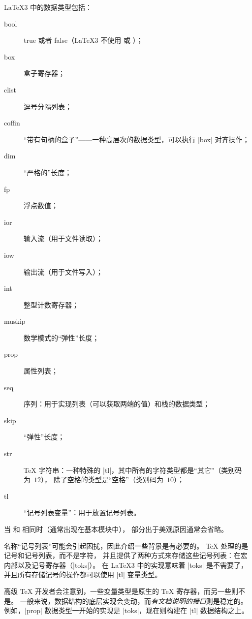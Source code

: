 \documentclass[full]{l3doc}
\begin{document}
\LaTeX3 中的数据类型包括：
\begin{description}
    \item[bool] true 或者 false（\LaTeX3 不使用  或 ）；
    \item[box] 盒子寄存器；
    \item[clist] 逗号分隔列表；
    \item[coffin] “带有句柄的盒子”——一种高层次的数据类型，可以执行 |box| 对齐操作；
    \item[dim] “严格的”长度；
    \item[fp] 浮点数值；
    \item[ior] 输入流（用于文件读取）；
    \item[iow] 输出流（用于文件写入）；
    \item[int] 整型计数寄存器；
    \item[muskip] 数学模式的“弹性”长度；
    \item[prop] 属性列表；
    \item[seq] 序列：用于实现列表（可以获取两端的值）和栈的数据类型；
    \item[skip] “弹性”长度；
    \item[str] \TeX{} 字符串：一种特殊的 |tl|，其中所有的字符类型都是“其它”（类别码为~$12$），
    除了空格的类型是“空格”（类别码为~$10$）；
    \item[tl] “记号列表变量”：用于放置记号列表。
\end{description}
当  和  相同时（通常出现在基本模块中），
 部分出于美观原因通常会省略。

%

名称“记号列表”可能会引起困扰，因此介绍一些背景是有必要的。
\TeX{} 处理的是记号和记号列表，而不是字符，
并且提供了两种方式来存储这些记号列表：在宏内部以及记号寄存器（|toks|）。
在 \LaTeX3 中的实现意味着 |toks| 是不需要了，
并且所有存储记号的操作都可以使用 |tl| 变量类型。

%
高级 \TeX{} 开发者会注意到，一些变量类型是原生的 \TeX{} 寄存器，而另一些则不是。
一般来说，数据结构的底层实现会变动，而\emph{有文档说明的接口}则是稳定的。
例如，|prop| 数据类型一开始的实现是 |toks|，现在则构建在 |tl| 数据结构之上。
\end{document}
